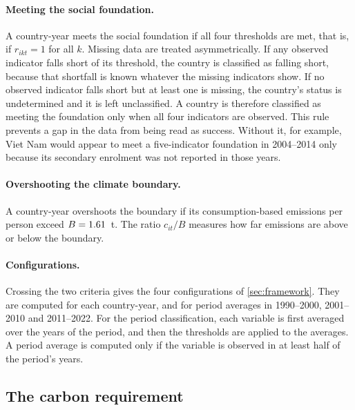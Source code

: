\paragraph{Meeting the social foundation.} A country-year meets the social foundation if all four thresholds are met, that is, if $r_{ikt}=1$ for all $k$. Missing data are treated asymmetrically. If any observed indicator falls short of its threshold, the country is classified as falling short, because that shortfall is known whatever the missing indicators show. If no observed indicator falls short but at least one is missing, the country's status is undetermined and it is left unclassified. A country is therefore classified as meeting the foundation only when all four indicators are observed. This rule prevents a gap in the data from being read as success. Without it, for example, Viet Nam would appear to meet a five-indicator foundation in 2004--2014 only because its secondary enrolment was not reported in those years.

\paragraph{Overshooting the climate boundary.} A country-year overshoots the boundary if its consumption-based \COtwo{} emissions per person exceed $B = 1.61$~t. The ratio $c_{it}/B$ measures how far emissions are above or below the boundary.

\paragraph{Configurations.} Crossing the two criteria gives the four configurations of \cref{sec:framework}. They are computed for each country-year, and for period averages in 1990--2000, 2001--2010 and 2011--2022. For the period classification, each variable is first averaged over the years of the period, and then the thresholds are applied to the averages. A period average is computed only if the variable is observed in at least half of the period's years.



\subsection{The carbon requirement}

